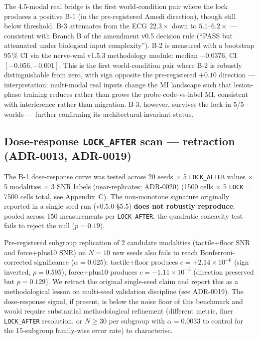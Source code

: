 \documentclass{article}
\begin{document}
The 4.5-modal real bridge is the first world-condition pair where
the lock produces a positive B-1 (in the pre-registered Amedi
direction), though still below threshold. B-3 attenuates from the
ECG $22.3\times$ down to $5.1$--$6.2\times$ --- consistent with
Branch B of the amendment v0.5 decision rule (``PASS but
attenuated under biological input complexity''). B-2 is measured
with a bootstrap 95\,\% CI via the nerve-wml v1.5.3 methodology
module: median $-0.0376$, CI $[-0.056, -0.001]$. This is the first
world-condition pair where B-2 is robustly distinguishable from
zero, with sign opposite the pre-registered $+0.10$ direction ---
interpretation: multi-modal real inputs change the MI landscape
such that lesion-phase training reduces rather than grows the
probe-code-vs-label MI, consistent with interference rather than
migration. B-3, however, survives the lock in 5/5 worlds ---
further confirming its architectural-invariant status.

\subsection{Dose-response \texttt{LOCK\_AFTER} scan --- retraction (ADR-0013, ADR-0019)}
\label{sec:dose-response}

The B-1 dose-response curve was tested across 20 seeds $\times$ 5
\texttt{LOCK\_AFTER} values $\times$ 5 modalities $\times$ 3 SNR
labels (near-replicates; ADR-0020) (1500 cells $\times$ 5 \texttt{LOCK} = 7500 cells total,
see Appendix~C). The non-monotone signature originally reported in
a single-seed run (v0.5.0 §5.5) \textbf{does not robustly reproduce}:
pooled across 150 measurements per \texttt{LOCK\_AFTER}, the quadratic
concavity test fails to reject the null ($p=0.19$).

Pre-registered subgroup replication of 2 candidate modalities
(tactile+floor SNR and force+plus10 SNR) on $N=10$ new seeds also
fails to reach Bonferroni-corrected significance ($\alpha=0.025$):
tactile+floor produces $c=+2.14 \times 10^{-6}$ (sign inverted,
$p=0.595$), force+plus10 produces $c=-1.11 \times 10^{-5}$
(direction preserved but $p=0.129$). We retract the original
single-seed claim and report this as a methodological lesson on
multi-seed validation discipline (see ADR-0019). The dose-response
signal, if present, is below the noise floor of this benchmark and
would require substantial methodological refinement (different
metric, finer \texttt{LOCK\_AFTER} resolution, or $N \geq 30$ per
subgroup with $\alpha=0.0033$ to control for the 15-subgroup
family-wise error rate) to characterise.
\end{document}
